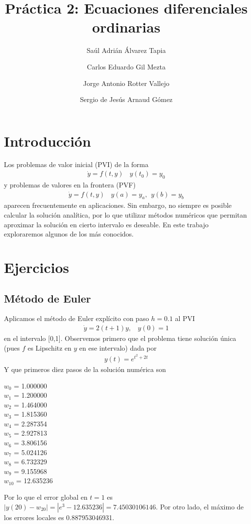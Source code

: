 \documentclass[spanish]{article}
\begin{document}
\author{Saúl Adrián Álvarez Tapia \and Carlos Eduardo Gil Mezta \and Jorge Antonio Rotter Vallejo \and Sergio de Jesús Arnaud Gómez}

\title{\Huge Práctica 2: Ecuaciones diferenciales ordinarias}
\date{}
\maketitle

\noindent
\section{Introducción}
Los problemas de valor inicial (PVI) de la forma
\begin{align*}
\dot{y} = f(t,y) \ \ \ \ y(t_0) = y_0
\end{align*}
y problemas de valores en la frontera (PVF)
\begin{align*}
\dot{y} = f(t,y) \ \ \ \ y(a) = y_a, \ \ y(b) = y_b
\end{align*}
aparecen frecuentemente en aplicaciones. Sin embargo, no siempre es posible calcular
la solución analítica, por lo que utilizar métodos numéricos que permitan aproximar
la solución en cierto intervalo es deseable. En este trabajo exploraremos algunos de
los más conocidos.



\section{Ejercicios}
\subsection{Método de Euler}
Aplicamos el método de Euler explícito con paso $h = 0.1$ al PVI
\begin{align}
\dot{y} = 2(t+1)y, \ \ \ \ y(0) = 1
\end{align}
en el intervalo [0,1]. Observemos primero que el problema tiene solución única (pues
$f$ es Lipschitz en $y$ en ese intervalo) dada por
\begin{align}
y(t) = e^{t^2+2t}
\end{align}
Y que primeros diez pasos de la solución numérica son
\begin{multicols}{3}
\noindent
$w_0$ = 1.000000\\
$w_1$ = 1.200000 \\
$w_2$ = 1.464000 \\
$w_3$ = 1.815360 \\
$w_4$ = 2.287354 \\
$w_5$ = 2.927813 \\
$w_6$ = 3.806156 \\
$w_7$ = 5.024126 \\
$w_8$ = 6.732329 \\
$w_9$ = 9.155968 \\
$w_{10}$ = 12.635236
\end{multicols}
\noindent
Por lo que el error global en $t=1$ es $|y(20)-w_{20}| = |e^3 - 12.635236| = 
7.45030106146.$ Por otro lado, el máximo de los errores locales es 0.887953046931. 
\end{document}
